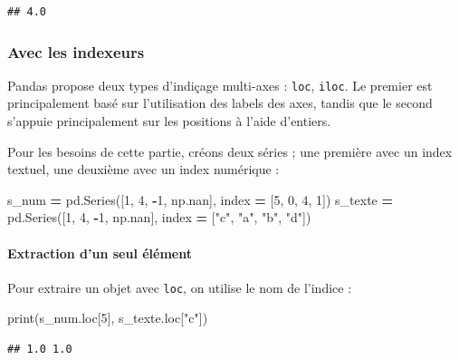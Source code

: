\documentclass[12pt,]{book}
\newenvironment{Shaded}{\begin{snugshade}}{\end{snugshade}}
\newcommand{\DecValTok}[1]{\textcolor[rgb]{0.00,0.00,0.81}{#1}}
\newcommand{\StringTok}[1]{\textcolor[rgb]{0.31,0.60,0.02}{#1}}
\newcommand{\OperatorTok}[1]{\textcolor[rgb]{0.81,0.36,0.00}{\textbf{#1}}}
\newcommand{\BuiltInTok}[1]{#1}
\newcommand{\NormalTok}[1]{#1}
\let\oldparagraph\paragraph
\renewcommand{\paragraph}[1]{\oldparagraph{#1}\mbox{}}
\numberwithin{equation}{section}
\numberwithin{countremarque}{section}
\begin{document}
\begin{lstlisting}
## 4.0
\end{lstlisting}

\subsubsection{Avec les indexeurs}\label{avec-les-indexeurs}

Pandas propose deux types d'indiçage multi-axes : \texttt{loc},
\texttt{iloc}. Le premier est principalement basé sur l'utilisation des
labels des axes, tandis que le second s'appuie principalement sur les
positions à l'aide d'entiers.

Pour les besoins de cette partie, créons deux séries ; une première avec
un index textuel, une deuxième avec un index numérique :

\begin{Shaded}
\begin{Highlighting}[]
\NormalTok{s_num }\OperatorTok{=}\NormalTok{ pd.Series([}\DecValTok{1}\NormalTok{, }\DecValTok{4}\NormalTok{, }\OperatorTok{-}\DecValTok{1}\NormalTok{, np.nan],}
\NormalTok{             index }\OperatorTok{=}\NormalTok{ [}\DecValTok{5}\NormalTok{, }\DecValTok{0}\NormalTok{, }\DecValTok{4}\NormalTok{, }\DecValTok{1}\NormalTok{])}
\NormalTok{s_texte }\OperatorTok{=}\NormalTok{ pd.Series([}\DecValTok{1}\NormalTok{, }\DecValTok{4}\NormalTok{, }\OperatorTok{-}\DecValTok{1}\NormalTok{, np.nan],}
\NormalTok{             index }\OperatorTok{=}\NormalTok{ [}\StringTok{"c"}\NormalTok{, }\StringTok{"a"}\NormalTok{, }\StringTok{"b"}\NormalTok{, }\StringTok{"d"}\NormalTok{])}
\end{Highlighting}
\end{Shaded}

\paragraph{Extraction d'un seul
élément}\label{extraction-dun-seul-element}

Pour extraire un objet avec \texttt{loc}, on utilise le nom de l'indice
:

\begin{Shaded}
\begin{Highlighting}[]
\BuiltInTok{print}\NormalTok{(s_num.loc[}\DecValTok{5}\NormalTok{], s_texte.loc[}\StringTok{"c"}\NormalTok{])}
\end{Highlighting}
\end{Shaded}

\begin{lstlisting}
## 1.0 1.0
\end{lstlisting}
\end{document}
